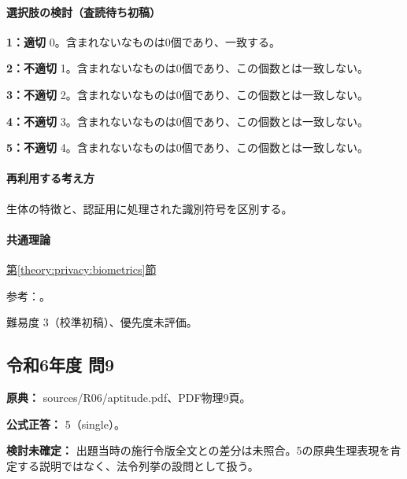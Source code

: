 \paragraph{選択肢の検討（査読待ち初稿）}\mbox{}\par

\noindent\textbf{1：適切} 0。含まれないなものは0個であり、一致する。\par

\noindent\textbf{2：不適切} 1。含まれないなものは0個であり、この個数とは一致しない。\par

\noindent\textbf{3：不適切} 2。含まれないなものは0個であり、この個数とは一致しない。\par

\noindent\textbf{4：不適切} 3。含まれないなものは0個であり、この個数とは一致しない。\par

\noindent\textbf{5：不適切} 4。含まれないなものは0個であり、この個数とは一致しない。\par

\paragraph{再利用する考え方} 生体の特徴と、認証用に処理された識別符号を区別する。

\paragraph{共通理論} \hyperref[theory:privacy:biometrics]{第\ref*{theory:privacy:biometrics}節}

\par 参考：\cite{privacy_general}。

\par 難易度 3（校準初稿）、優先度未評価。

\subsection{令和6年度 問9}
\label{q:r06-reg-apt-09}

\noindent\textbf{原典：} sources/R06/aptitude.pdf、PDF物理9頁。

\textbf{公式正答：} 5（single）。

\par\textbf{検討未確定：} 出題当時の施行令版全文との差分は未照合。5の原典生理表現を肯定する説明ではなく、法令列挙の設問として扱う。

